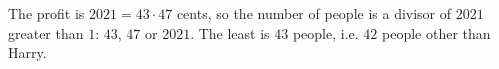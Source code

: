 The profit is $2021=43\cdot47$ cents, so the number of people is a divisor of $2021$ greater than $1$: $43$, $47$ or $2021$. The least is $43$ people, i.e. $\boxed{42}$ people other than Harry.
